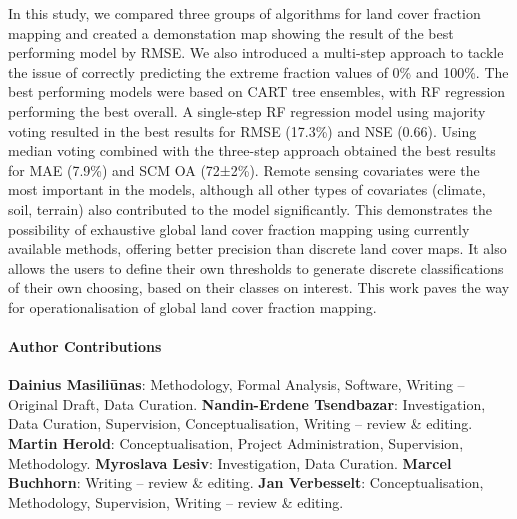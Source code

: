 \documentclass[review,authoryear,3p]{elsarticle}
\newcommand{\minisection}[1]{\paragraph{#1}}%
\begin{document}
In this study, we compared three groups of algorithms for land cover fraction mapping and created a demonstation map showing the result of the best performing model by \gls{RMSE}.
We also introduced a multi-step approach to tackle the issue of correctly predicting the extreme fraction values of 0\% and 100\%.
The best performing models were based on \gls{CART} tree ensembles, with \gls{RF} regression performing the best overall.
A single-step \gls{RF} regression model using majority voting resulted in the best results for RMSE (17.3\%) and \gls{NSE} (0.66).
Using median voting combined with the three-step approach obtained the best results for \gls{MAE} (7.9\%) and \gls{SCM} \gls{OA} (72±2\%).
Remote sensing covariates were the most important in the models, although all other types of covariates (climate, soil, terrain) also contributed to the model significantly.
This demonstrates the possibility of exhaustive global land cover fraction mapping using currently available methods, offering better precision than discrete land cover maps.
It also allows the users to define their own thresholds to generate discrete classifications of their own choosing, based on their classes on interest.
This work paves the way for operationalisation of global land cover fraction mapping.

\minisection{Author Contributions}
\textbf{Dainius Masiliūnas}: Methodology, Formal Analysis, Software, Writing – Original Draft, Data Curation. \textbf{Nandin-Erdene Tsendbazar}: Investigation, Data Curation, Supervision, Conceptualisation, Writing – review \& editing. \textbf{Martin Herold}: Conceptualisation, Project Administration, Supervision, Methodology. \textbf{Myroslava Lesiv}: Investigation, Data Curation. \textbf{Marcel Buchhorn}: Writing – review \& editing. \textbf{Jan Verbesselt}: Conceptualisation, Methodology, Supervision, Writing – review \& editing.

\end{document}

